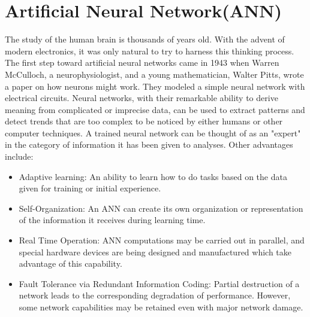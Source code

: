 \documentclass[12pt]{report}
\begin{document}
\section{Artificial Neural Network(ANN)}
The study of the human brain is thousands of years old. With the advent of modern electronics, it was only natural to try to harness this thinking process. The first step toward artificial neural networks came in 1943 when Warren McCulloch, a neurophysiologist, and a young mathematician, Walter Pitts, wrote a paper on how neurons might work. They modeled a simple neural network with electrical circuits. Neural networks, with their remarkable ability to derive meaning from complicated or imprecise data, can be used to extract patterns and detect trends that are too complex to be noticed by either humans or other computer techniques. A trained neural network can be thought of as an "expert" in the category of information it has been given to analyses. Other advantages include:
\begin{itemize}
	\item Adaptive learning: An ability to learn how to do tasks based on the data given for training or initial experience.
	\item Self-Organization: An ANN can create its own organization or representation of the information it receives during learning time.
	\item Real Time Operation: ANN computations may be carried out in parallel, and special hardware devices are being designed and manufactured which take advantage of this capability.
	\item Fault Tolerance via Redundant Information Coding: Partial destruction of a network leads to the corresponding degradation of performance. However, some network capabilities may be retained even with major network damage.
\end{itemize}
\end{document}
